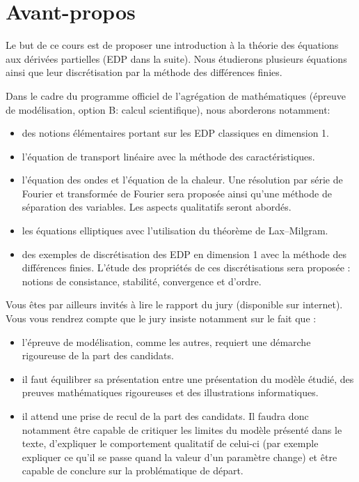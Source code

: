 \documentclass[12pt,a4paper,twoside]{article}
\begin{document}
\section*{Avant-propos}

Le but de ce cours est de proposer une introduction \`a la th\'eorie
des \'equations aux d\'eriv\'ees partielles (EDP dans la suite).
Nous \'etudierons plusieurs \'equations ainsi que leur discr\'etisation
par la m\'ethode des diff\'erences finies.

Dans le cadre du programme officiel de l'agr\'egation
de math\'ematiques (\'epreuve de mod\'elisation, option B: calcul scientifique), 
nous aborderons notamment:
\begin{itemize}
\item des notions \'el\'ementaires portant sur les EDP classiques en dimension 1.
\item l'\'equation de transport lin\'eaire avec la m\'ethode des caract\'eristiques.
\item l'\'equation des ondes et l'\'equation de la chaleur.
  Une r\'esolution par s\'erie de Fourier
  et transform\'ee de Fourier sera propos\'ee ainsi qu'une m\'ethode de s\'eparation
  des variables.
  Les aspects qualitatifs seront abord\'es.
\item les \'equations elliptiques avec l'utilisation du th\'eor\`eme de Lax--Milgram.
\item des exemples de discr\'etisation des EDP en dimension 1 avec la m\'ethode des
  diff\'erences finies. L'\'etude des propri\'et\'es de ces discr\'etisations
  sera propos\'ee : notions de consistance, stabilit\'e, convergence et d'ordre.
\end{itemize}


Vous \^etes par ailleurs invit\'es \`a lire le rapport du jury (disponible sur internet).
Vous vous rendrez compte que le jury insiste notamment sur le fait que :
\begin{itemize}
\item l'\'epreuve de mod\'elisation, comme les autres, requiert une d\'emarche rigoureuse
  de la part des candidats.
\item il faut \'equilibrer sa pr\'esentation entre une pr\'esentation du mod\`ele \'etudi\'e,
  des preuves math\'ematiques rigoureuses et des illustrations informatiques.
\item il attend une prise de recul de la part des candidats.
  Il faudra donc notamment \^etre capable de critiquer les limites du mod\`ele pr\'esent\'e
  dans le texte, d'expliquer le comportement qualitatif de celui-ci 
  (par exemple expliquer ce qu'il se passe quand la valeur d'un param\`etre change)
  et \^etre capable de conclure sur la probl\'ematique de d\'epart.
\end{itemize}
\end{document}
